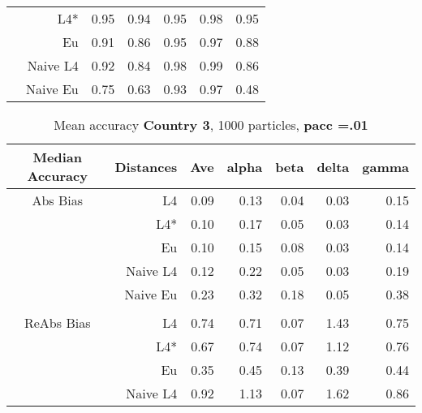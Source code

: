 \documentclass[a4paper,12pt,twoside]{book}
\begin{document}
\begin{table}[H]
\begin{tabular}{crrrrrr}
 &L4*  &   0.95 & 0.94 & 0.95 & 0.98 & 0.95 \\ 
   
&Eu &   0.91 & 0.86 & 0.95 & 0.97 & 0.88 \\ 
  
&Naive L4&  
  0.92 & 0.84 & 0.98 & 0.99 & 0.86 \\
&Naive Eu &     0.75 & 0.63 & 0.93 & 0.97 & 0.48 \\ 
  
\end{tabular}

\end{table}


\begin{table}[H]

\centering
\vfill
\caption{Mean  accuracy \textbf{Country 3}, 1000 particles, \textbf{pacc =.01}}


\begin{tabular}{crrrrrr}
  \hline
  
{\color{blue}Median Accuracy} & Distances & Ave & alpha & beta & delta & gamma \\ 
  \hline
{\color{blue}Abs Bias}& L4  &0.09 & 0.13 & 0.04 & 0.03 & 0.15 \\ 
  
 &L4*  &   0.10 & 0.17 & 0.05 & 0.03 & 0.14 \\ 
 
 
&Eu &    0.10 & 0.15 & 0.08 & 0.03 & 0.14 \\ 
  
&Naive L4&       
0.12 & 0.22 & 0.05 & 0.03 & 0.19 \\
 

&Naive Eu &    0.23 & 0.32 & 0.18 & 0.05 & 0.38 \\ 
  
  \\ 
   \hline
   
{\color{blue} ReAbs Bias } & L4  &0.74 & 0.71 & 0.07 & 1.43 & 0.75 \\ 
  
&L4*  &  0.67 & 0.74 & 0.07 & 1.12 & 0.76 \\ 
 
  
&Eu &   
 0.35 & 0.45 & 0.13 & 0.39 & 0.44 \\ 
  
  
&Naive L4&   

  0.92 & 1.13 & 0.07 & 1.62 & 0.86 \\ 
 

\end{tabular}
\end{table}
\end{document}
